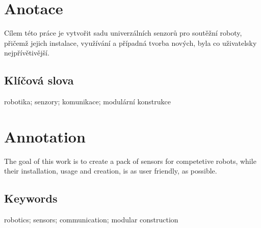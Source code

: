 \documentclass{template/socthesis}
\author{Tomáš Rohlínek}
\begin{document}
	\maketitle
	
	
	
	\pagestyle{empty}
	
	\section*{Anotace}
	Cílem této práce je vytvořit sadu univerzálních senzorů pro soutěžní roboty, přičemž jejich instalace, využívání a případná tvorba nových, byla co uživatelsky nejpřívětivější.
	
	\subsection*{Klíčová slova}
	robotika; senzory; komunikace; modulární konstrukce
	
	\vspace{20mm}
	
	\section*{Annotation}
	The goal of this work is to create a pack of sensors for competetive robots, while their installation, usage and creation, is as user friendly, as possible. 
	
	\subsection*{Keywords}
	robotics; sensors; communication; modular construction
	
	\newpage
	\pagestyle{plain}
	
	\tableofcontents %
	
	\setcounter{figure}{0}
	\setcounter{table}{0}
	\newpage
	
	
	
	
	
	
	
	
	
	
\end{document}
